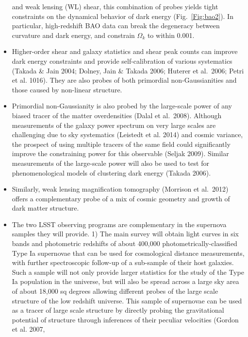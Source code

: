 \begin{itemize}
and weak lensing (WL) shear, this combination of probes yields tight constraints on the
dynamical behavior of dark energy (Fig.~\ref{Fig:bao2}). In particular, high-redshift BAO data can break
the degeneracy between curvature and dark energy, and constrain $\Omega_k$ to within
0.001.
\item Higher-order shear and galaxy statistics and shear peak counts can improve dark energy
constraints and provide self-calibration of various systematics (Takada \& Jain 2004;
Dolney, Jain \& Takada 2006; Huterer et al.~2006; Petri et al. 1016). They are also probes of both
primordial non-Gaussianities and those caused by non-linear structure.
\item Primordial non-Gaussianity is also probed by the large-scale power of any biased tracer of the matter
overdensities (Dalal et al.~2008). Although measurements of the galaxy power spectrum on very large scales
are challenging due to sky systematics (Leistedt et al. 2014) and cosmic variance, the prospect of using
multiple tracers of the same field could significantly improve the constraining power for this observable
(Seljak 2009). Similar measurements of the large-scale power will also be used to test for phenomenological
models of clustering dark energy (Takada 2006).
\item Similarly, weak lensing magnification tomography (Morrison et al.~2012) offers a
complementary probe of a mix of cosmic geometry and growth of dark matter structure.
\item The two LSST observing programs are complementary in the supernova samples they will provide. 1) The main survey will
obtain light curves in six bands and photometric redshifts of about 400,000 photometrically-classified Type
Ia supernovae that can be used for cosmological distance measurements, with further spectroscopic
follow-up of a sub-sample of their host galaxies.  
Such a sample will not only provide larger statistics
for the study of the Type Ia population in the universe, but will also be spread across a large sky
area of about 18,000 sq degrees allowing different probes of the large scale structure of the low redshift
universe. This sample of supernovae can be used as a tracer of large scale structure by directly probing the 
gravitational potential of structure through inferences of their peculiar velocities (Gordon et al. 2007, 

\end{itemize}
